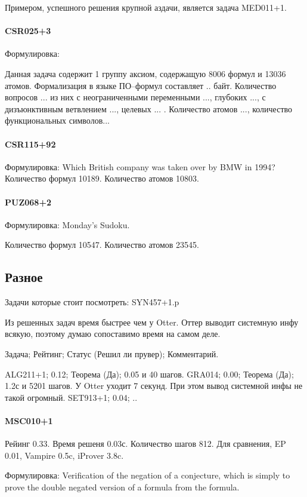 Примером, успешного решения крупной аздачи, является задача MED011+1.

\paragraph{CSR025+3}
Формулировка:

Данная задача содержит 1 группу аксиом, содержащую 8006 формул и 13036 атомов. Формализация в языке ПО--формул составляет .. байт. Количество вопросов ... из них с неограниченными переменными ..., глубоких ..., с дизъюнктивным ветвлением ..., целевых ... . Количество атомов ..., количество функциональных символов...

\paragraph{CSR115+92}
Формулировка: Which British company was taken over by BMW in 1994?
Количество формул 10189. Количество атомов 10803.


\paragraph{PUZ068+2}
Формулировка: Monday's Sudoku.

Количество формул 10547. Количество атомов 23545.




\subsection{Разное}
Задачи которые стоит посмотреть:
SYN457+1.p

Из решенных задач время быстрее чем у Otter. Оттер выводит системную инфу всякую, поэтому думаю сопоставимо время на самом деле.

Задача; Рейтинг; Статус (Решил ли прувер); Комментарий.

ALG211+1; 0.12; Теорема (Да); 0.05 и 40 шагов.
GRA014; 0.00; Теорема (Да); 1.2с и 5201 шагов. У Otter уходит 7 секунд. При этом вывод системной инфы не такой огромный.
SET913+1; 0.04; ..


\paragraph{MSC010+1}
Рейинг 0.33. Время решеня 0.03с. Количество шагов 812. Для сравнения, EP 0.01, Vampire 0.5c, iProver 3.8c.

Формулировка: Verification of the negation of a conjecture, which is simply to prove the double negated version of a formula from the formula.

